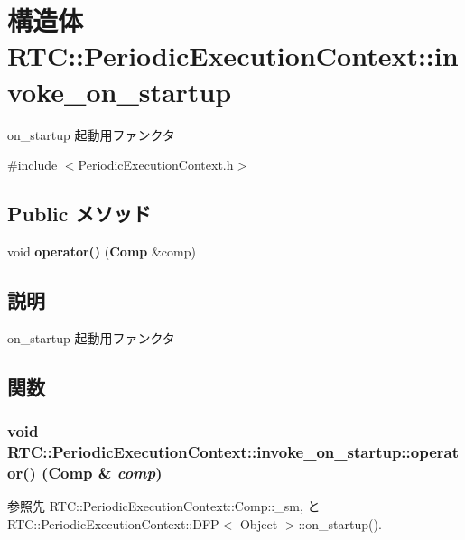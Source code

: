 \section{構造体 RTC::PeriodicExecutionContext::invoke\_\-on\_\-startup}
\label{structRTC_1_1PeriodicExecutionContext_1_1invoke__on__startup}


on\_\-startup 起動用ファンクタ  




{\ttfamily \#include $<$PeriodicExecutionContext.h$>$}

\subsection*{Public メソッド}
\begin{DoxyCompactItemize}
\item 
void {\bf operator()} ({\bf Comp} \&comp)
\end{DoxyCompactItemize}


\subsection{説明}
on\_\-startup 起動用ファンクタ 

\subsection{関数}
\subsubsection[{operator()}]{\setlength{\rightskip}{0pt plus 5cm}void RTC::PeriodicExecutionContext::invoke\_\-on\_\-startup::operator() ({\bf Comp} \& {\em comp})\hspace{0.3cm}{\ttfamily  [inline]}}\label{structRTC_1_1PeriodicExecutionContext_1_1invoke__on__startup_adda237953995471a223c0ec6123205e1}


参照先 RTC::PeriodicExecutionContext::Comp::\_\-sm, と RTC::PeriodicExecutionContext::DFP$<$ Object $>$::on\_\-startup().

